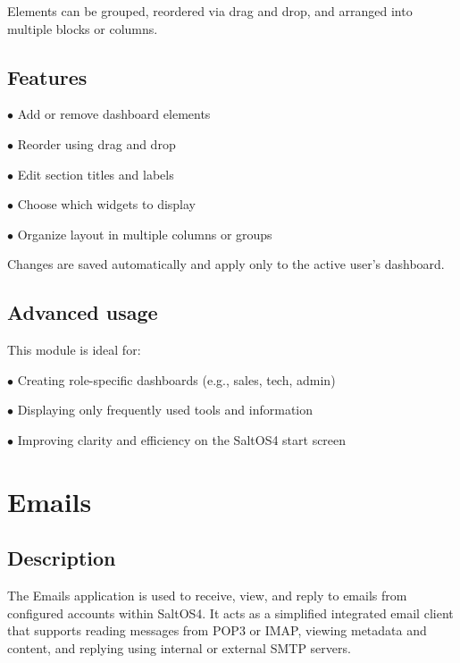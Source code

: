 \documentclass[a4paper]{article}
\begin{document}
Elements can be grouped, reordered via drag and drop, and arranged into multiple blocks or columns.

\hypertarget{toc88}{}
\subsection{Features}

\begin{compactitem}
\item[\color{myblue}$\bullet$] Add or remove dashboard elements
\item[\color{myblue}$\bullet$] Reorder using drag and drop
\item[\color{myblue}$\bullet$] Edit section titles and labels
\item[\color{myblue}$\bullet$] Choose which widgets to display
\item[\color{myblue}$\bullet$] Organize layout in multiple columns or groups
\end{compactitem}

Changes are saved automatically and apply only to the active user’s dashboard.

\hypertarget{toc89}{}
\subsection{Advanced usage}

This module is ideal for:

\begin{compactitem}
\item[\color{myblue}$\bullet$] Creating role-specific dashboards (e.g., sales, tech, admin)
\item[\color{myblue}$\bullet$] Displaying only frequently used tools and information
\item[\color{myblue}$\bullet$] Improving clarity and efficiency on the SaltOS4 start screen
\end{compactitem}


\hypertarget{toc90}{}
\section{Emails}

\hypertarget{toc91}{}
\subsection{Description}

The Emails application is used to receive, view, and reply to emails from configured accounts within SaltOS4.
It acts as a simplified integrated email client that supports reading messages from POP3 or IMAP,
viewing metadata and content, and replying using internal or external SMTP servers.
\end{document}
